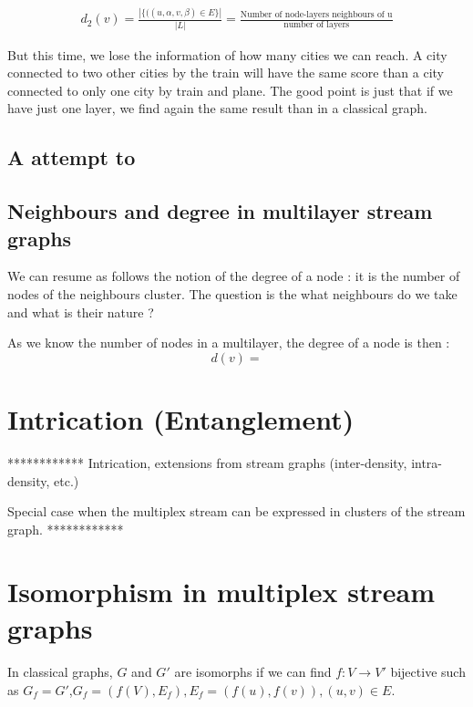 \documentclass[dvipsnames,a4paper,11pt]{article}
\theoremstyle{definition}
\theoremstyle{remark}
\theoremstyle{remark}
\begin{document}
		\begin{align}
			d_2(v)= \frac{|\{((u,\alpha,v,\beta) \in E\}|}{|L|} = \frac{\text{Number of node-layers neighbours of u}}{\text{number of layers}}
		\end{align}
		
		But this time, we lose the information of how many cities we can reach. A city connected to two other cities by the train will have the same score than a city connected to only one city by train and plane. The good point is just that if we have just one layer, we find again the same result than in a classical graph.
		
		\subsection{A attempt to }
		
		\subsection{Neighbours and degree in multilayer stream graphs}
		
		We can resume as follows the notion of the degree of a node : it is the number of nodes of the neighbours cluster. The question is the what neighbours do we take and what is their nature ?
		
		As we know the number of nodes in a multilayer, the degree of a node is then : 
		$$
			d(v) = 
		$$
	
	
	
	\section{Intrication (Entanglement)}

	************
    Intrication, extensions from stream graphs (inter-density, intra-density, etc.)

    Special case when the multiplex stream can be expressed in clusters of the stream graph.
    ************


    \section{Isomorphism in multiplex stream graphs}
    \paragraph{}
    In classical graphs, $G$ and $G'$ are isomorphs if we can find $f:V \rightarrow V'$ bijective such as $G_f=G'$,$G_f=(f(V),E_f), E_f={(f(u),f(v)), (u,v) \in E}$.
\end{document}
